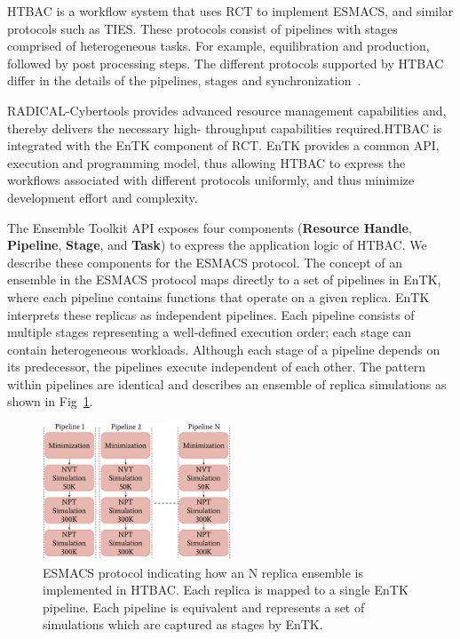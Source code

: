 
HTBAC is a workflow system that uses RCT to implement ESMACS, and similar
protocols such as TIES\@. These protocols consist of pipelines with stages
comprised of heterogeneous tasks. For example, equilibration and production,
followed by post processing steps. The different protocols supported by HTBAC
differ in the details of the pipelines, stages and
synchronization~\cite{Bhati2017}.


RADICAL-Cybertools provides advanced resource management capabilities and,
thereby delivers the necessary high- throughput capabilities required.HTBAC is
integrated with the EnTK component of RCT. EnTK provides a common API,
execution and programming model, thus allowing HTBAC to express the workflows
associated with different protocols uniformly, and thus minimize development
effort and complexity.

The Ensemble Toolkit API exposes four components (\textbf{Resource Handle},
\textbf{Pipeline}, \textbf{Stage}, and \textbf{Task}) to express the
application logic of HTBAC\@. We describe these components for the ESMACS
protocol\@. The concept of an ensemble in the ESMACS protocol maps directly to 
a set of pipelines in EnTK, where each pipeline contains functions that operate 
on a given replica. EnTK interprets these replicas as independent pipelines. 
Each pipeline consists of multiple stages representing a well-defined execution 
order; each stage can contain heterogeneous workloads. Although each stage of a 
pipeline depends on its predecessor, the pipelines execute independent of each 
other. The pattern within pipelines are identical and describes an ensemble of replica
simulations as shown in Fig~\ref{figure:ESMACS-pipelines}.


\begin{figure}
\centering
  \includegraphics[width=0.5\textwidth]{FIGURES/HT-BAC_NAMD_pipelines_control_flow_only.pdf}
  \caption{ESMACS protocol indicating how an N replica ensemble is implemented in HTBAC.
  Each replica is mapped to a single EnTK pipeline. 
  Each pipeline is equivalent and represents a set of simulations which are captured as stages by
  EnTK.}\label{figure:ESMACS-pipelines}
\end{figure}

